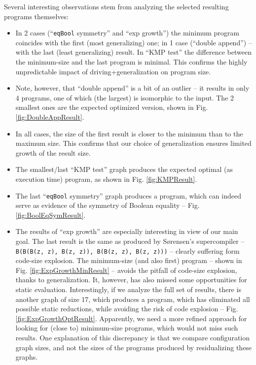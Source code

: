 \documentclass[submission,copyright,creativecommons]{eptcs}
\begin{document}
Several interesting observations stem from analyzing the selected resulting programs themselves:
\begin{itemize}
  \item In 2 cases (``\verb|eqBool| symmetry'' and ``exp growth'') the minimum program coincides with the first (most generalizing) one;
    in 1 case (``double append'') -- with the last (least generalizing) result. 
    In ``KMP test'' the difference between the minimum-size and the last program is minimal.
    This confirms the highly unpredictable impact of driving+generalization on program size.
  \item Note, however, that ``double append'' is a bit of an outlier -- it results in only 4 programs,
    one of which (the largest) is isomorphic to the input. The 2 smallest ones are the expected
    optimized version, shown in Fig. \ref{fig:DoubleAppResult}.
  \item In all cases, the size of the first result is closer to the minimum than to the maximum size.
    This confirms that our choice of generalization ensures limited growth of the result size.
  \item The smallest/last ``KMP test'' graph produces the expected optimal (as execution time) program,
    as shown in Fig. \ref{fig:KMPResult}.
  \item The last ``\verb|eqBool| symmetry'' graph produces a program, which can indeed serve as evidence of the
    symmetry of Boolean equality -- Fig. \ref{fig:BoolEqSymResult}.
  \item The results of ``exp growth'' are especially interesting in view of our main goal.
    The last result is the same as produced by S{\o}rensen's supercompiler --
    \verb|B(B(B(z, z), B(z, z)), B(B(z, z), B(z, z)))| -- clearly suffering form code-size explosion.
    The minimum-size (and also first) program -- shown in Fig. \ref{fig:ExpGrowthMinResult} --
    avoids the pitfall of code-size explosion, thanks to generalization.
    It, however, has also missed some opportunities for static evaluation.
    Interestingly, if we analyze the full set of results, there is another
    graph of size 17, which produces a program, which has eliminated all possible static reductions,
    while avoiding the risk of code explosion -- Fig. \ref{fig:ExpGrowthOptResult}.
    Apparently, we need a more refined approach for looking for (close to) minimum-size programs, which
    would not miss such results.
    One explanation of this discrepancy is that we compare configuration graph sizes, and not
    the sizes of the programs produced by residualizing these graphs.

\end{itemize}
\end{document}
